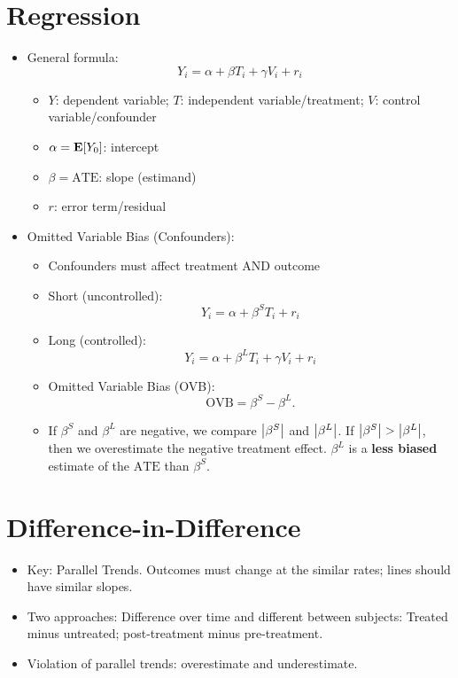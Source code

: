 \documentclass[10pt, letterpaper]{article}
\def\E{\vb{E}}
\def\ATE{\mathrm{ATE}}
\def\OVB{\mathrm{OVB}}
\begin{document}
\begin{multicols}{2}
\section*{Regression}
\begin{itemize}
	\item General formula: \[Y_i=\alpha+\beta T_i+\gamma V_i+r_i\]
	\begin{itemize}
		\item $Y$: dependent variable; $T$: independent variable/treatment; $V$: control variable/confounder
		\item $\alpha=\E[Y_0]$: intercept
		\item $\beta=\ATE$: slope (estimand)
		\item $r$: error term/residual
	\end{itemize}
	\item Omitted Variable Bias (Confounders): 
	\begin{itemize}
		\item Confounders must affect treatment AND outcome
		\item Short (uncontrolled): \[Y_i=\alpha+\beta^S T_i+r_i\]
		\item Long (controlled): \[Y_i=\alpha+\beta^L T_i+\gamma V_i+r_i\]
		\item Omitted Variable Bias (OVB): \[\OVB=\beta^S-\beta^L.\]
		\item If $\beta^S$ and $\beta^L$ are negative, we compare $\qty|\beta^S|$ and $\qty|\beta^L|$. If $\qty|\beta^S|>\qty|\beta^L|$, then we overestimate the negative treatment effect. $\beta^L$ is a \textbf{less biased} estimate of the $\ATE$ than $\beta^S$.
	\end{itemize}
\end{itemize}

\section*{Difference-in-Difference}
\begin{itemize}
	\item Key: Parallel Trends. Outcomes must change at the similar rates; lines should have similar slopes. 
	\item Two approaches: Difference over time and different between subjects: Treated minus untreated; post-treatment minus pre-treatment.
	\item Violation of parallel trends: overestimate and underestimate. 
\end{itemize}


\end{multicols}
\end{document}
